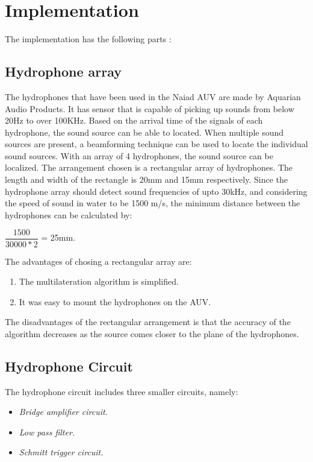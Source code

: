\section{Implementation}\label{sec:implementation}
The implementation has the following parts :

\subsection{Hydrophone array}
The hydrophones that have been used in the Naiad AUV are made by Aquarian Audio Products. It has sensor that is capable of picking up sounds from below 20Hz to over 100KHz. Based on the arrival time of the signals of each hydrophone, the sound source can be able to located. When multiple sound sources are present, a beamforming technique can be used to locate the individual sound sources. \newline
With an array of 4 hydrophones, the sound source can be localized. The arrangement chosen is a rectangular array of hydrophones. The length and width of the rectangle is 20mm and 15mm respectively. Since the hydrophone array should detect sound frequencies of upto 30kHz, and considering the speed of sound in water to be 1500 m/s, the minimum distance between the hydrophones can be calculated by:
\begin{center}
$\dfrac{1500}{30000 * 2}$ = 25mm.
\end{center}

The advantages of chosing a rectangular array are:\begin{enumerate}
\item The multilateration algorithm is simplified.
\item It was easy to mount the hydrophones on the AUV.
\end{enumerate}
The disadvantages of the rectangular arrangement is that the accuracy of the algorithm decreases as the source comes closer to the plane of the hydrophones. 


\subsection{Hydrophone Circuit}
The hydrophone circuit includes three smaller circuits, namely:
\begin{itemize}
   \item { \em Bridge amplifier circuit.}
   \item { \em Low pass filter. }
   \item { \em Schmitt trigger circuit. }
\end{itemize}
